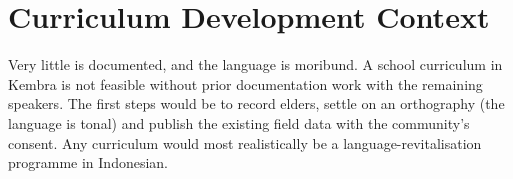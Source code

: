 \documentclass[12pt]{article}
\begin{document}
\section{Curriculum Development Context}
Very little is documented, and the language is moribund. A school curriculum in Kembra is not feasible without prior documentation work with the remaining speakers. The first steps would be to record elders, settle on an orthography (the language is tonal) and publish the existing field data with the community's consent. Any curriculum would most realistically be a language-revitalisation programme in Indonesian.
\end{document}
